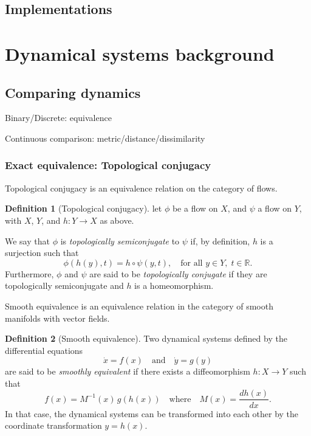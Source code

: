 \documentclass{article}
\theoremstyle{definition} \newtheorem{definition}{Definition}  \newtheorem{example}{Example}
\theoremstyle{remark} \newtheorem{remark}{Remark}
\newcounter{ct}
\begin{document}
\subsection{Implementations}
\citep{miolane2020geomstats}







\newpage
\section{Dynamical systems background}

\subsection{Comparing dynamics}
Binary/Discrete: equivalence

Continuous comparison: metric/distance/dissimilarity



\subsubsection{Exact equivalence: Topological conjugacy}\label{sec:top_conj}

Topological conjugacy is an equivalence relation on the category of flows. %
\begin{definition}[Topological conjugacy]\label{def:top_conj}
let $\phi$ be a flow on $X$, and $\psi$ a flow on $Y$, with $X$, $Y$, and $h\colon Y \to X$ as above.

We say that $\phi$ is \emph{topologically semiconjugate} to $\psi$ if, by definition, $h$ is a surjection such that
\[
\phi(h(y), t) = h \circ \psi(y, t), \quad \text{for all } y \in Y, \; t \in \mathbb{R}.
\]
Furthermore, $\phi$ and $\psi$ are said to be \emph{topologically conjugate} if they are topologically semiconjugate and $h$ is a homeomorphism.
\end{definition}

Smooth equivalence is an equivalence relation in the category of smooth manifolds with vector fields. %
\begin{definition}[Smooth equivalence]\label{def:smooth_equivalence}
Two dynamical systems defined by the differential equations 
\[
\dot{x} = f(x) \quad \text{and} \quad \dot{y} = g(y)
\]
are said to be \emph{smoothly equivalent} if there exists a diffeomorphism \( h \colon X \to Y \) such that
\[
f(x) = M^{-1}(x) \, g(h(x)) \quad \text{where} \quad M(x) = \frac{d h(x)}{d x}.
\]
In that case, the dynamical systems can be transformed into each other by the coordinate transformation \( y = h(x) \).
\end{definition}
\end{document}
